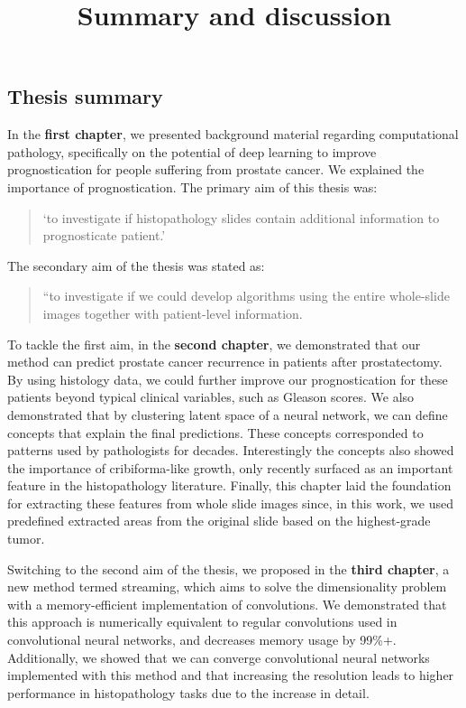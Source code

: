 \documentclass[
  12pt,
  a5,margin=2cmpaper,
]{article}
\title{Summary and discussion}
\author{}
\date{}
\begin{document}
\maketitle

\hypertarget{thesis-summary}{%
\subsection{Thesis summary}\label{thesis-summary}}

In the \textbf{first chapter}, we presented background material
regarding computational pathology, specifically on the potential of deep
learning to improve prognostication for people suffering from prostate
cancer. We explained the importance of prognostication. The primary aim
of this thesis was:

\begin{quote}
`to investigate if histopathology slides contain additional information
to prognosticate patient.'
\end{quote}

The secondary aim of the thesis was stated as:

\begin{quote}
``to investigate if we could develop algorithms using the entire
whole-slide images together with patient-level information.
\end{quote}

To tackle the first aim, in the \textbf{second chapter}, we demonstrated
that our method can predict prostate cancer recurrence in patients after
prostatectomy. By using histology data, we could further improve our
prognostication for these patients beyond typical clinical variables,
such as Gleason scores. We also demonstrated that by clustering latent
space of a neural network, we can define concepts that explain the final
predictions. These concepts corresponded to patterns used by
pathologists for decades. Interestingly the concepts also showed the
importance of cribiforma-like growth, only recently surfaced as an
important feature in the histopathology literature. Finally, this
chapter laid the foundation for extracting these features from whole
slide images since, in this work, we used predefined extracted areas
from the original slide based on the highest-grade tumor.

Switching to the second aim of the thesis, we proposed in the
\textbf{third chapter}, a new method termed streaming, which aims to
solve the dimensionality problem with a memory-efficient implementation
of convolutions. We demonstrated that this approach is numerically
equivalent to regular convolutions used in convolutional neural
networks, and decreases memory usage by 99\%+. Additionally, we showed
that we can converge convolutional neural networks implemented with this
method and that increasing the resolution leads to higher performance in
histopathology tasks due to the increase in detail.
\end{document}
